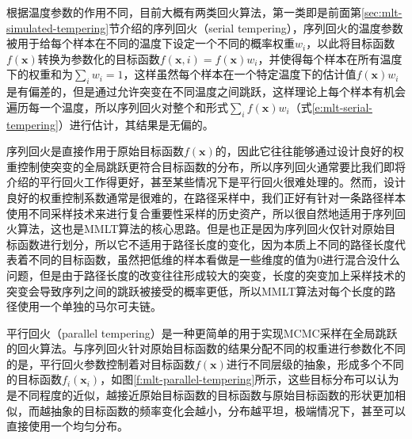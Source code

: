 根据温度参数的作用不同，目前大概有两类回火算法，第一类即是前面第\ref{sec:mlt-simulated-tempering}节介绍的序列回火（serial tempering），序列回火的温度参数被用于给每个样本在不同的温度下设定一个不同的概率权重$w_i$，以此将目标函数$f(\mathbf{x})$转换为参数化的目标函数$f(\mathbf{x},i)=f(\mathbf{x})w_i$，并使得每个样本在所有温度下的权重和为$\sum_i w_i=1$，这样虽然每个样本在一个特定温度下的估计值$f(\mathbf{x})w_i$是有偏差的，但是通过允许突变在不同温度之间跳跃，这样理论上每个样本有机会遍历每一个温度，所以序列回火对整个和形式$\sum_if(\mathbf{x})w_i$（式\ref{e:mlt-serial-tempering}）进行估计，其结果是无偏的。

序列回火是直接作用于原始目标函数$f(\mathbf{x})$的，因此它往往能够通过设计良好的权重控制使突变的全局跳跃更符合目标函数的分布，所以序列回火通常要比我们即将介绍的平行回火工作得更好，甚至某些情况下是平行回火很难处理的\cite{a:AnnealingMarkovChainMonteCarlowithApplicationstoAncestralInference}。然而，设计良好的权重控制系数通常是很难的，在路径采样中，我们正好有针对一条路径样本使用不同采样技术来进行复合重要性采样的历史资产，所以很自然地适用于序列回火算法，这也是MMLT算法的核心思路。但是也正是因为序列回火仅针对原始目标函数进行划分，所以它不适用于路径长度的变化，因为本质上不同的路径长度代表着不同的目标函数，虽然把低维的样本看做是一些维度的值为0进行混合没什么问题，但是由于路径长度的改变往往形成较大的突变，长度的突变加上采样技术的突变会导致序列之间的跳跃被接受的概率更低，所以MMLT算法对每个长度的路径使用一个单独的马尔可夫链。

平行回火（parallel tempering）\cite{a:MarkovChainMonteCarloMaximumLikelihood}是一种更简单的用于实现MCMC采样在全局跳跃的回火算法。与序列回火针对原始目标函数的结果分配不同的权重进行参数化不同的是，平行回火参数控制着对目标函数$f(\mathbf{x})$进行不同层级的抽象，形成多个不同的目标函数$f_i(\mathbf{x}_i)$，如图\ref{f:mlt-parallel-tempering}所示，这些目标分布可以认为是不同程度的近似，越接近原始目标函数的目标函数与原始目标函数的形状更加相似，而越抽象的目标函数的频率变化会越小，分布越平坦，极端情况下，甚至可以直接使用一个均匀分布\cite{a:RobustAdaptivePhotonTracingusingPhotonPathVisibility}。

